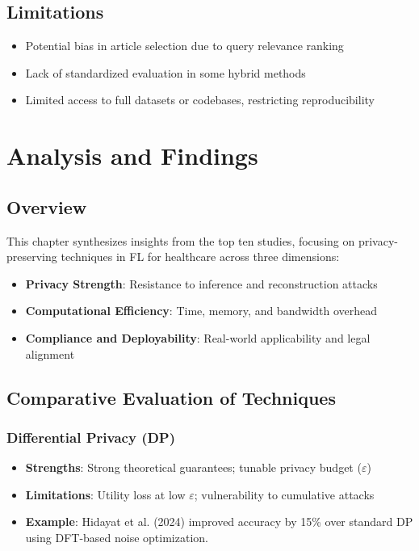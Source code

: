 \documentclass[12pt]{report}
\begin{document}
\section{Limitations}
\begin{itemize}
    \item Potential bias in article selection due to query relevance ranking
    \item Lack of standardized evaluation in some hybrid methods
    \item Limited access to full datasets or codebases, restricting reproducibility
\end{itemize}

\chapter{Analysis and Findings}

\section{Overview}
This chapter synthesizes insights from the top ten studies, focusing on privacy-preserving techniques in FL for healthcare across three dimensions:
\begin{itemize}
    \item \textbf{Privacy Strength}: Resistance to inference and reconstruction attacks
    \item \textbf{Computational Efficiency}: Time, memory, and bandwidth overhead
    \item \textbf{Compliance and Deployability}: Real-world applicability and legal alignment
\end{itemize}

\section{Comparative Evaluation of Techniques}

\subsection{Differential Privacy (DP)}
\begin{itemize}
    \item \textbf{Strengths}: Strong theoretical guarantees; tunable privacy budget ($\varepsilon$)
    \item \textbf{Limitations}: Utility loss at low $\varepsilon$; vulnerability to cumulative attacks
    \item \textbf{Example}: Hidayat et al. (2024) improved accuracy by 15\% over standard DP using DFT-based noise optimization.
\end{itemize}
\end{document}
